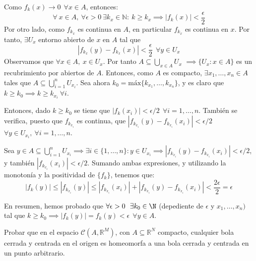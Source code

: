   \begin{sol}
    Como $f_k(x) \to 0\ \ \forall x \in A$, entonces:  $$\forall \ x \in A,\ \forall \epsilon >0\ \exists k_x \in \mathbb{N}:\ k\geq k_x \implies |f_k(x)| < \frac{\epsilon}{2}$$
    Por otro lado, como $f_{k_x}$ es continua en $A$, en particular $f_{k_x}$ es continua en $x$. Por tanto, $\exists U_x$ entorno abierto de $x$ en $A$ tal que $$|f_{k_x}(y) - f_{k_x}(x)| < \frac{\epsilon}{2}\ \ \forall y \in U_x$$
    Observamos que $\forall x \in A, \ x \in U_x$. Por tanto $A \subseteq \bigcup_{x\in A} U_x$ $\implies \{U_x: x\in A\}$ es un recubrimiento por abiertos de $A$. Entonces, como $A$ es compacto, $\exists x_1,\dots,x_n \in A$ tales que $A \subseteq \bigcup_{i=1}^{n} U_{x_{i}}$. Sea ahora $k_0 = \text{máx}\{k_{x_1},\dots,k_{x_n}\}$, y es claro que $k \ge k_0 \implies k \ge k_{x_i}\ \forall i$.

    Entonces, dado $k \ge k_0$ se tiene que $|f_k(x_i)| < \epsilon/2 \ \ \forall i = 1,\dots,n$. También se verifica, puesto que $f_{k_{x_i}}$ es continua, que  $|f_{k_{x_i}} (y) - f_{k_{x_i}}(x_i)| < \epsilon/2$ \ \ $\forall y \in U_{x_i}, \ \forall i = 1,\dots,n$.

    Sea $y \in A \subseteq \bigcup_{i=1}^n U_{x_i} \implies \exists i \in \{1,\dots, n\}: y \in U_{x_i} \implies |f_{k_{x_i}}(y) - f_{k_{x_i}}(x_i)| < \epsilon/2$, y también $|f_{k_{x_i}}(x_i)| < \epsilon/2$. Sumando ambas expresiones, y utilizando la monotonía y la positividad de $\{f_k\}$, tenemos que: $$|f_k(y)| \leq |f_{k_{x_i}}(y)| \leq |f_{k_{x_i}} (x_i)| + |f_{k_{x_i}} (y) - f_{k_{x_i}}(x_i)| < \frac{2\epsilon}{2} = \epsilon$$

    En resumen, hemos probado que $\forall \epsilon > 0 \ \ \exists k_0 \in \N$ (depediente de $\epsilon$ y $x_1,\dots, x_n)$ tal que $k\geq k_0 \implies |f_k(y)| = f_k(y) < \epsilon \ \ \forall y \in A$.
  \end{sol}

\begin{ejer} Probar que en el espacio $\mathcal{C}(A,\mathbb{R}^M)$, con $A \subseteq \mathbb{R}^N$ compacto, cualquier bola cerrada y centrada en el origen es homeomorfa a una bola cerrada y centrada en un punto arbitrario.

\end{ejer}

